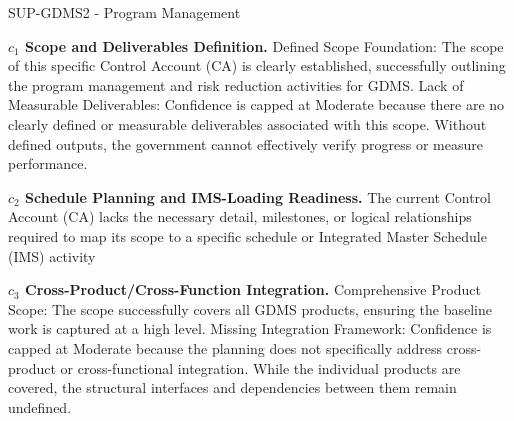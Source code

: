 \begin{frame}{SUP-GDMS2 - Program Management}
\begin{minipage}{0.90\textwidth}
\raggedright
\fontsize{8}{9.5}\selectfont
\textbf{\(c_1\) Scope and Deliverables Definition.}
Defined Scope Foundation: The scope of this specific Control Account (CA) is clearly established, successfully outlining the program management and risk reduction activities for GDMS. Lack of Measurable Deliverables: Confidence is capped at Moderate because there are no clearly defined or measurable deliverables associated with this scope. Without defined outputs, the government cannot effectively verify progress or measure performance.\par\vspace{0.6em}
\textbf{\(c_2\) Schedule Planning and IMS-Loading Readiness.}
The current Control Account (CA) lacks the necessary detail, milestones, or logical relationships required to map its scope to a specific schedule or Integrated Master Schedule (IMS) activity\par\vspace{0.6em}
\textbf{\(c_3\) Cross-Product/Cross-Function Integration.}
Comprehensive Product Scope: The scope successfully covers all GDMS products, ensuring the baseline work is captured at a high level. Missing Integration Framework: Confidence is capped at Moderate because the planning does not specifically address cross-product or cross-functional integration. While the individual products are covered, the structural interfaces and dependencies between them remain undefined.\par\vspace{0.6em}
\end{minipage}
\end{frame}

\endinput
